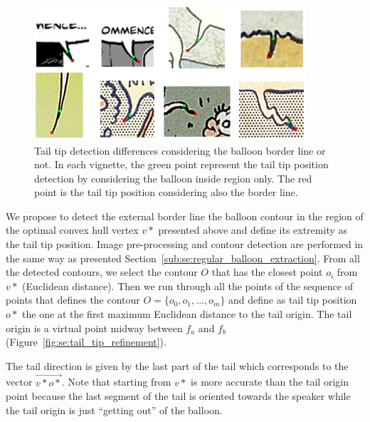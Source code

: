     \begin{figure}[ht]%
      \centering
      \includegraphics[width=0.9\textwidth]{tail_examples.png}
    \caption[Tail tip position precise position]{Tail tip detection differences considering the balloon border line or not. In each vignette, the green point represent the tail tip position detection by considering the balloon inside region only.
    The red point is the tail tip position considering also the border line.}
    \label{fig:se:tail_examples}
    \end{figure}

We propose to detect the external border line the balloon contour in the region of the optimal convex hull vertex $v*$ presented above and define its extremity as the tail tip position.
Image pre-processing and contour detection are performed in the same way as presented Section~\ref{sub:se:regular_balloon_extraction}.
From all the detected contours, we select the contour $O$ that has the closest point $o_i$ from $v*$ (Euclidean distance).
Then we run through all the points of the sequence of points that defines the contour $O=\{o_0, o_1,...,o_m\}$ and define as tail tip position $o*$ the one at the first maximum Euclidean distance to the tail origin.
The tail origin is a virtual point midway between $f_a$ and $f_b$ (Figure~\ref{fig:se:tail_tip_refinement}).


The tail direction is given by the last part of the tail which corresponds to the vector $\overrightarrow{v*o*}$.
Note that starting from $v*$ is more accurate than the tail origin point because the last segment of the tail is oriented towards the speaker while the tail origin is just ``getting out'' of the balloon.


